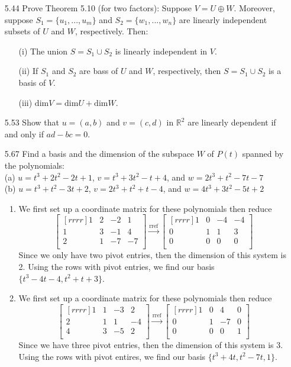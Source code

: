 \documentclass[12pt]{article}
\theoremstyle{plain}
\theoremstyle{definition}
\theoremstyle{plain}
\begin{document}
\begin{enumerate}
\item[5.44]Prove Theorem 5.10 (for two factors): Suppose $V=U\oplus W$. Moreover, suppose $S_1=\{u_1,...,u_m\}$ and $S_2=\{w_1,...,w_n\}$ are linearly independent subsets of $U$ and $W$, respectively. Then:
	\begin{enumerate}
	\item[(i)] The union $S=S_1 \cup S_2$ is linearly independent in $V$.
	\item[(ii)] If $S_1$ and $S_2$ are bass of $U$ and $W$, respectively, then $S=S_1 \cup S_2$ is a basis of $V$.
	\item[(iii)] $\mathrm{dim}V = \mathrm{dim}U + \mathrm{dim}W$.
	\end{enumerate}
	
\item[5.53]Show that $u=(a,b)$ and $v=(c,d)$ in $\mathbb{R}^2$ are linearly dependent if and only if $ad-bc=0$.

\item[5.67]Find a basis and the dimension of the subspace $W$ of $P(t)$ spanned by the polynomials:\\
(a) $u=t^3+2t^2-2t+1$, $v=t^3+3t^2-t+4$, and $w=2t^3+t^2-7t-7$\\
(b) $u=t^3+t^2-3t+2$, $v=2t^3+t^2+t-4$, and $w=4t^3+3t^2-5t+2$
	\begin{enumerate}
	\item We first set up a coordinate matrix for these polynomials then reduce
		\[ \begin{bmatrix}[rrrr]1&2&-2&1\\1&3&-1&4\\2&1&-7&-7\\\end{bmatrix} \xrightarrow[]{\mathrm{rref}} \begin{bmatrix}[rrrr]1&0&-4&-4\\0&1&1&3\\0&0&0&0\\\end{bmatrix} \]
		Since we only have two pivot entries, then the dimension of this system is 2. Using the rows with pivot entries, we find our basis $\{t^3-4t-4,t^2+t+3\}$.
	\item We first set up a coordinate matrix for these polynomials then reduce
		\[ \begin{bmatrix}[rrrr]1&1&-3&2\\2&1&1&-4\\4&3&-5&2\\\end{bmatrix} \xrightarrow[]{\mathrm{rref}} \begin{bmatrix}[rrrr]1&0&4&0\\0&1&-7&0\\0&0&0&1\\\end{bmatrix} \]
		Since we have three pivot entries, then the dimension of this system is 3. Using the rows with pivot entires, we find our basis $\{t^3+4t,t^2-7t,1\}$.
	\end{enumerate}
	

\end{enumerate}
\end{document}
